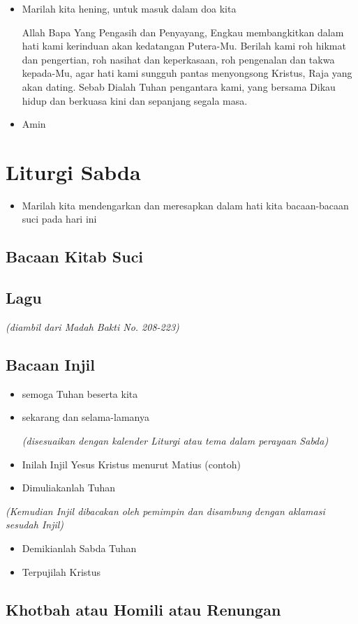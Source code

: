 \documentclass[a4paper,12pt]{article}
\newcommand{\BU}[1]{\begin{itemize} \item[U:] #1 \end{itemize}}
\newcommand{\BP}[1]{\begin{itemize} \item[P:] #1 \end{itemize}}
\begin{document}
\BP{Marilah kita hening, untuk masuk dalam doa kita

Allah Bapa Yang Pengasih dan Penyayang, Engkau membangkitkan dalam hati kami kerinduan akan kedatangan Putera-Mu.
Berilah kami roh hikmat dan pengertian, roh nasihat dan keperkasaan, roh pengenalan dan takwa kepada-Mu, agar hati kami
sungguh pantas menyongsong Kristus, Raja yang akan dating. Sebab Dialah Tuhan pengantara kami, yang bersama Dikau hidup
dan berkuasa kini dan sepanjang segala masa.}

\BU{Amin}

\section{Liturgi Sabda}

\BP{Marilah kita mendengarkan dan meresapkan dalam hati kita bacaan-bacaan suci pada hari ini}

\subsection*{Bacaan Kitab Suci}

\subsection*{Lagu}

\textit{(diambil dari Madah Bakti No. 208-223)}

\subsection*{Bacaan Injil}

\BP{semoga Tuhan beserta kita}

\BU{sekarang dan selama-lamanya

\textit{(disesuaikan dengan kalender Liturgi atau tema dalam perayaan Sabda)}
}

\BP{Inilah Injil Yesus Kristus menurut Matius (contoh)}

\BU{Dimuliakanlah Tuhan}

\textit{(Kemudian Injil dibacakan oleh pemimpin dan disambung dengan aklamasi sesudah Injil)
}
\BP{Demikianlah Sabda Tuhan}

\BU{Terpujilah Kristus}

\subsection*{Khotbah atau Homili atau Renungan}
\end{document}
